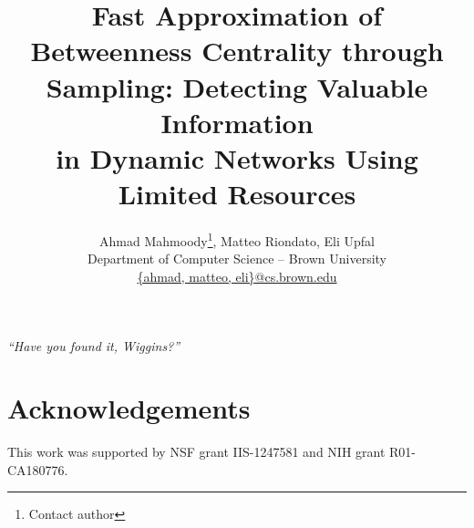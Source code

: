 \documentclass[10pt]{article}
\begin{document}
\title{Fast Approximation of Betweenness Centrality through Sampling}
\author{Ahmad Mahmoody\footnote{Contact author}, Matteo Riondato, Eli Upfal\\
Department of Computer Science -- Brown University \\
\url{{ahmad, matteo, eli}@cs.brown.edu}}

\title{\algonamebasecap: Detecting Valuable Information\\in Dynamic Networks Using Limited Resources}
\maketitle

\textit{``Have you found it, Wiggins?''}
\begin{flushright}
\end{flushright}










\section{Acknowledgements}
This work was supported by NSF grant IIS-1247581 and NIH grant R01-CA180776.



%


% 
\end{document}
